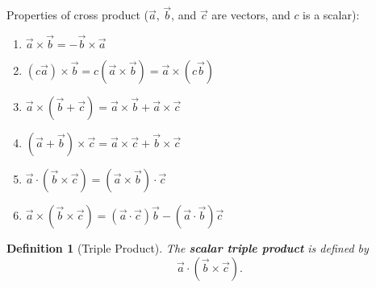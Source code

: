 \documentclass[12pt,a4paper]{article}
\newtheorem{df}{Definition}[subsection]
\def\veca{\vec{a}}
\def\vecb{\vec{b}}
\def\vecc{\vec{c}}
\begin{document}
Properties of cross product ($\veca$, $\vecb$, and $\vecc$ are vectors, and $c$ is a scalar): 
\begin{enumerate}
	\item $\veca\times\vecb=-\vecb\times\veca$
	\item $(c\veca)\times\vecb=c(\veca\times\vecb)=\veca\times(c\vecb)$
	\item $\veca\times(\vecb+\vecc)=\veca\times\vecb+\veca\times\vecc$
	\item $(\veca+\vecb)\times\vecc=\veca\times\vecc+\vecb\times\vecc$
	\item $\veca\cdot(\vecb\times\vecc)=(\veca\times\vecb)\cdot\vecc$
	\item $\veca\times(\vecb\times\vecc)=(\veca\cdot\vecc)\vecb-(\veca\cdot\vecb)\vecc$
\end{enumerate}
\begin{df}[Triple Product]
	The \textbf{scalar triple product} is defined by \[\veca\cdot(\vecb\times\vecc).\]
\end{df}
\end{document}
